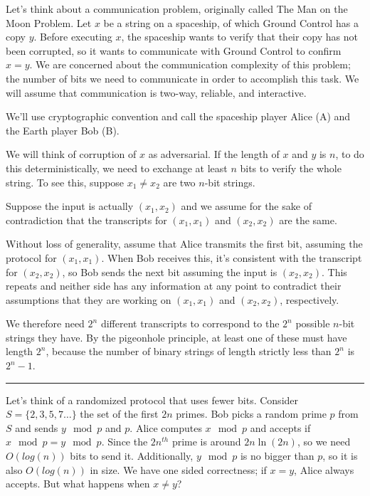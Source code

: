 \documentclass[twoside]{article}
\newenvironment{proof}{{\bf Proof:}}{\hfill\rule{2mm}{2mm}}
\begin{document}
Let's think about a communication problem, originally called The Man on the Moon Problem.  Let $x$ be a string on a spaceship, of which Ground Control has a copy $y$.  Before executing $x$, the spaceship wants to verify that their copy has not been corrupted, so it wants to communicate with Ground Control to confirm $x=y$.  We are concerned about the communication complexity of this problem; the number of bits we need to communicate in order to accomplish this task.  We will assume that communication is two-way, reliable, and interactive.

We'll use cryptographic convention and call the spaceship player Alice (A) and the Earth player Bob (B).

We will think of corruption of $x$ as adversarial.  If the length of $x$ and $y$ is $n$, to do this deterministically, we need to exchange at least $n$ bits to verify the whole string.  To see this, suppose $x_1\neq x_2$ are two $n$-bit strings.  


\begin{proof}
	
	Suppose the input is actually $(x_1,x_2)$ and we assume for the sake of contradiction that the transcripts for $(x_1,x_1)$ and $(x_2,x_2)$ are the same.
	
	Without loss of generality, assume that Alice transmits the first bit, assuming the protocol for $(x_1,x_1)$.  When Bob receives this, it's consistent with the transcript for $(x_2,x_2)$, so Bob sends the next bit assuming the input is $(x_2,x_2)$.  This repeats and neither side has any information at any point to contradict their assumptions that they are working on $(x_1,x_1)$ and $(x_2,x_2)$, respectively.
	
	We therefore need $2^n$ different transcripts to correspond to the $2^n$ possible $n$-bit strings they have.  By the pigeonhole principle, at least one of these must have length $2^n$, because the number of binary strings of length strictly less than $2^n$ is $2^n -1$.
	
	
	
\end{proof}


Let's think of a randomized protocol that uses fewer bits.  Consider $S=\{2,3,5,7\dots\}$ the set of the first $2n$ primes.  Bob picks a random prime $p$ from $S$ and sends $y\mod p$ and $p$.  Alice computes $x\mod p$ and accepts if $x\mod p = y\mod p$.  Since the $2n^{th}$ prime is around $2n\ln(2n)$, so we need $O(log(n))$ bits to send it.  Additionally, $y\mod p$ is no bigger than $p$, so it is also $O(log(n))$ in size.  We have one sided correctness; if $x=y$, Alice always accepts.  But what happens when $x\neq y$?
\end{document}
